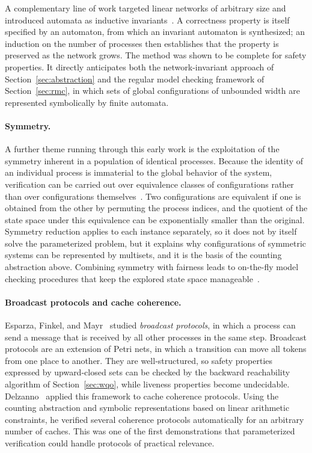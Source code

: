 A complementary line of work targeted linear networks of arbitrary size and
introduced automata as inductive invariants~\cite{SisGyu99}. A correctness
property is itself specified by an automaton, from which an invariant
automaton is synthesized; an induction on the number of processes then
establishes that the property is preserved as the network grows. The method
was shown to be complete for safety properties. It directly anticipates both
the network-invariant approach of Section~\ref{sec:abstraction} and the regular
model checking framework of Section~\ref{sec:rmc}, in which sets of global
configurations of unbounded width are represented symbolically by finite
automata.

\paragraph{Symmetry.}
A further theme running through this early work is the exploitation of the
symmetry inherent in a population of identical processes. Because the identity
of an individual process is immaterial to the global behavior of the system,
verification can be carried out over equivalence classes of configurations
rather than over configurations themselves~\cite{EmeSis96,CEFJ96,ID96}. Two
configurations are equivalent if one is obtained from the other by permuting
the process indices, and the quotient of the state space under this
equivalence can be exponentially smaller than the original. Symmetry
reduction applies to each instance separately, so it does not by itself solve
the parameterized problem, but it explains why configurations of symmetric
systems can be represented by multisets, and it is the basis of the counting
abstraction above. Combining symmetry with fairness leads to on-the-fly model
checking procedures that keep the explored state space
manageable~\cite{GyuSis97}.

\paragraph{Broadcast protocols and cache coherence.}
Esparza, Finkel, and Mayr~\cite{EFM99} studied \emph{broadcast protocols}, in
which a process can send a message that is received by all other processes in
the same step. Broadcast protocols are an extension of Petri nets, in which a
transition can move all tokens from one place to another. They are
well-structured, so safety properties expressed by upward-closed sets can be
checked by the backward reachability algorithm of Section~\ref{sec:wqo}, while
liveness properties become undecidable. Delzanno~\cite{Del00} applied this
framework to cache coherence protocols. Using the counting abstraction and
symbolic representations based on linear arithmetic constraints, he verified
several coherence protocols automatically for an arbitrary number of caches.
This was one of the first demonstrations that parameterized verification could
handle protocols of practical relevance.


